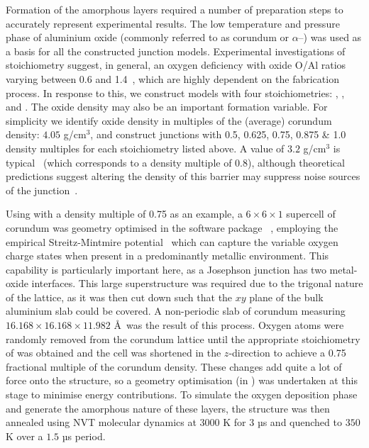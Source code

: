 Formation of the amorphous  layers required a number of preparation steps to accurately represent experimental results.
The low temperature and pressure phase of aluminium oxide (commonly referred to as corundum or $\alpha$--) was used as a basis for all the constructed junction models.
Experimental investigations of stoichiometry suggest, in general, an oxygen deficiency with oxide O/Al ratios varying between 0.6 and 1.4~\cite{Tan2005}, which are highly dependent on the fabrication process.
In response to this, we construct models with four stoichiometries: , ,  and .
The oxide density may also be an important formation variable.
For simplicity we identify oxide density in multiples of the (average) corundum density: $4.05$ g/cm$^\text{3}$, and construct junctions with 0.5, 0.625, 0.75, 0.875 \& 1.0 density multiples for each stoichiometry listed above.
A value of $3.2$ g/cm$^\text{3}$ is typical~\cite{Barbour1998} (which corresponds to a density multiple of 0.8), although theoretical predictions suggest altering the density of this barrier may suppress noise sources of the junction~\cite{DuBois2013}.

Using  with a density multiple of 0.75 as an example, a $6\!\times\!6\!\times\!1$ supercell of corundum was geometry optimised in the software package ~\cite{Gale2003}, employing the empirical Streitz-Mintmire potential~\cite{Streitz1994} which can capture the variable oxygen charge states when present in a predominantly metallic environment. This capability is particularly important here, as a Josephson junction has two metal-oxide interfaces.
This large superstructure was required due to the trigonal nature of the lattice, as it was then cut down such that the $xy$ plane of the bulk aluminium slab could be covered.
A non-periodic slab of corundum measuring $16.168\!\times\!16.168\!\times\!11.982$ \AA\ was the result of this process.
Oxygen atoms were randomly removed from the corundum lattice until the appropriate stoichiometry of  was obtained and the cell was shortened in the $z$-direction to achieve a 0.75 fractional multiple of the corundum density.
These changes add quite a lot of force onto the structure, so a geometry optimisation (in ) was undertaken at this stage to minimise energy contributions.
To simulate the oxygen deposition phase and generate the amorphous nature of these layers, the structure was then annealed using NVT molecular dynamics at $3000$ K for $3$ µs and quenched to $350$ K over a $1.5$ µs period.

